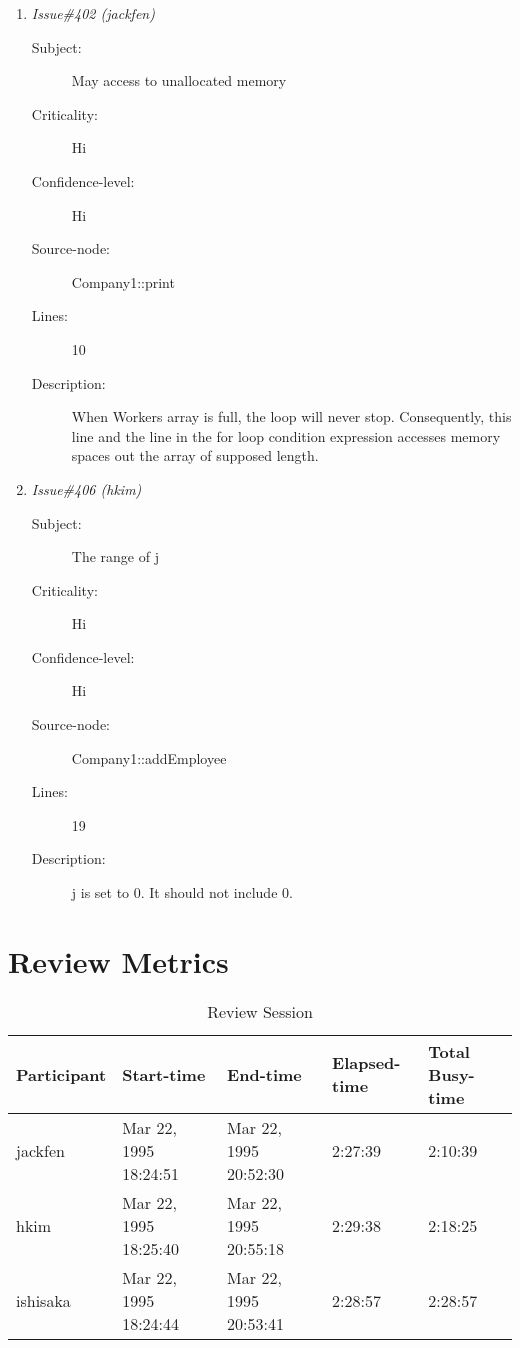 \begin{enumerate}
\begin{description}
\item [Lines:] 6

\item [Description:] When Workers array is full, there will be no
Null pointers to stop the loop.
\end{description}
\item {\it Issue\#402 (jackfen)}
\begin{description}
\item [Subject:] May access to unallocated memory
\item [Criticality:] Hi
\item [Confidence-level:] Hi
\item [Source-node:] Company1::print

\item [Lines:] 10

\item [Description:] When Workers array is full, the loop will
never stop. Consequently, this line and the line in the for loop condition expression
accesses memory spaces out the array of supposed length.
\end{description}
\item {\it Issue\#406 (hkim)}
\begin{description}
\item [Subject:] The range of j
\item [Criticality:] Hi
\item [Confidence-level:] Hi
\item [Source-node:] Company1::addEmployee

\item [Lines:] 19

\item [Description:] j is set to 0. It should not include 0.
\end{description}
\end{enumerate}
\section{Review Metrics}
\begin{table}[hb]
\begin{center}
\begin{tabular}{|l|l|l|l|l|}
\hline
Participant & Start-time & End-time & Elapsed-time & Total Busy-time \\
\hline
jackfen & Mar 22, 1995 18:24:51 & Mar 22, 1995 20:52:30 & 2:27:39 & 2:10:39 \\
hkim & Mar 22, 1995 18:25:40 & Mar 22, 1995 20:55:18 & 2:29:38 & 2:18:25 \\
ishisaka & Mar 22, 1995 18:24:44 & Mar 22, 1995 20:53:41 & 2:28:57 & 2:28:57 \\
\hline
\end{tabular}
\end{center}
\caption{Review Session}
\end{table}


